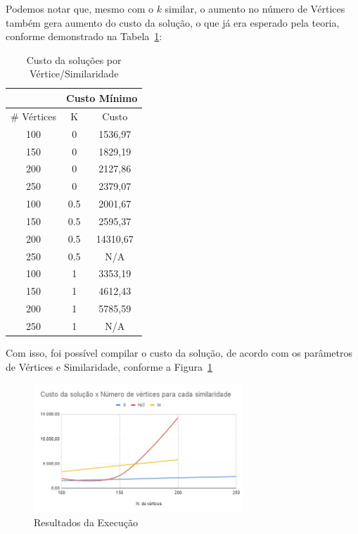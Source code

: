 \documentclass{article}
\begin{document}
Podemos notar que, mesmo com o $k$ similar, o aumento no número de Vértices também gera aumento do custo da solução, o que já era esperado pela teoria, conforme demonstrado na Tabela~\ref{f:tab-execucao}:

\begin{table}[]
\label{t:custo}
\centering
\begin{tabular}{c|c|c}
            & \multicolumn{2}{c}{Custo Mínimo} \\ \hline
\# Vértices & K  & Custo \\ \hline
100         & 0       & 1536,97 \\ \hline
150         & 0       & 1829,19 \\ \hline
200         & 0       & 2127,86 \\ \hline
250         & 0       & 2379,07 \\ \hline
100         & 0.5     & 2001,67 \\ \hline
150         & 0.5     & 2595,37 \\ \hline
200         & 0.5     & 14310,67\\ \hline
250         & 0.5     & N/A     \\ \hline
100         & 1       & 3353,19 \\ \hline
150         & 1       & 4612,43 \\ \hline
200         & 1       & 5785,59 \\ \hline
250         & 1       &   N/A
\end{tabular}
\caption{Custo da soluções por Vértice/Similaridade}
\label{f:tab-execucao}
\end{table}

Com isso, foi possível compilar o custo da solução, de acordo com os parâmetros de Vértices e Similaridade, conforme a Figura~\ref{f:g-custo}
\begin{figure}
    \centering
    \includegraphics[width=0.7\textwidth]{figures/sol-custo.jpeg}
    \caption{Resultados da Execução}
    \label{f:g-custo}
\end{figure}
\end{document}

